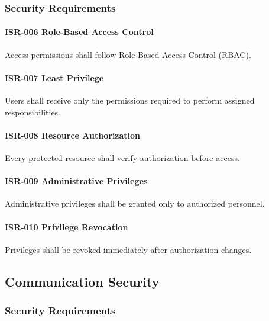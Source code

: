 \subsubsection*{Security Requirements}

\paragraph{ISR-006 Role-Based Access Control}

Access permissions shall follow Role-Based Access Control (RBAC).

\paragraph{ISR-007 Least Privilege}

Users shall receive only the permissions required to perform assigned
responsibilities.

\paragraph{ISR-008 Resource Authorization}

Every protected resource shall verify authorization before access.

\paragraph{ISR-009 Administrative Privileges}

Administrative privileges shall be granted only to authorized personnel.

\paragraph{ISR-010 Privilege Revocation}

Privileges shall be revoked immediately after authorization changes.


\subsection{Communication Security}

\subsubsection*{Security Requirements}

